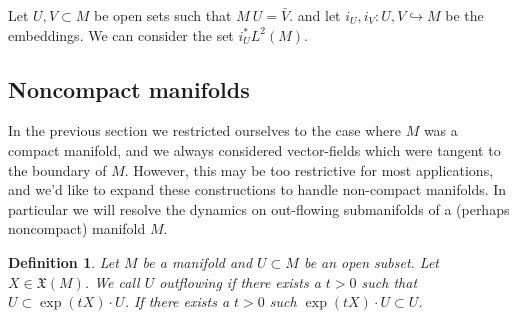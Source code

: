 \documentclass[12pt]{amsart}
\newtheorem{defn}{Definition}
\begin{document}
Let $U,V \subset M$ be open sets such that $M \ U = \bar{V}$.
and let $i_U,i_V: U,V \hookrightarrow M$ be the embeddings.
We can consider the set $i^*_U L^2(M)$.


\subsection{Noncompact manifolds}
  In the previous section we restricted ourselves to the
case where $M$ was a compact manifold, and we always considered
vector-fields which were tangent to the boundary of $M$.
However, this may be too restrictive for most applications, and
we'd like to expand these constructions to handle non-compact
manifolds.
In particular we will resolve the dynamics on out-flowing
submanifolds of a (perhaps noncompact) manifold $M$.

\begin{defn}
  Let $M$ be a manifold and $U \subset M$ be an open subset.
  Let $X \in \mathfrak{X}(M)$.
  We call $U$ \emph{outflowing} if there exists a $t > 0$
  such that $U \subset \exp(t X) \cdot U$.
  If there exists a $t>0$ such $\exp(t X) \cdot U \subset U$.
\end{defn}
\end{document}
